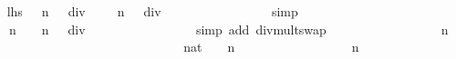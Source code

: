 \begin{isabellebody}
\ \isamarkupfalse%
\ {\isachardoublequoteopen}{\isacharquery}lhs\ {\isacharequal}\ \ {}{\isacharasterisk}{\isacharparenleft}{\isacharparenleft}{}{\isacharcircum}n\ {\isacharminus}\ {}{\isacharparenright}\ div\ {}{\isacharparenright}\ {\isacharplus}\ {\isacharparenleft}{}\ {\isacharcircum}\ n\ {\isacharplus}\ {}{\isacharparenright}\ div\ {}{\isachardoublequoteclose}\isanewline
\ \ \ \ \ \ \ \ \ \ \ \ \ \ \isamarkupfalse%
\ simp\isanewline
\ \ \ \ \ \ \ \ \ \ \ \ \isamarkupfalse%
\ \isamarkupfalse%
\ {\isachardoublequoteopen}{\isachardot}{\isachardot}{\isachardot}\ {\isacharequal}\ {\isacharparenleft}{\isacharparenleft}{}{\isacharasterisk}{}{\isacharcircum}n\ {\isacharminus}\ {}{\isacharparenright}\ {\isacharplus}\ {\isacharparenleft}{}{\isacharcircum}n\ {\isacharplus}\ {}{\isacharparenright}{\isacharparenright}\ div\ {}{\isachardoublequoteclose}\isanewline
\ \ \ \ \ \ \ \ \ \ \ \ \ \ \isamarkupfalse%
\ {\isacharparenleft}simp\ add{\isacharcolon}\ div{\isacharunderscore}mult{\isacharunderscore}swap{\isacharparenright}\isanewline
\ \ \ \ \ \ \ \ \ \ \ \ \isamarkupfalse%
\ \isamarkupfalse%
\ {\isachardoublequoteopen}{\isachardot}{\isachardot}{\isachardot}\ {\isacharequal}\ {}{\isacharasterisk}{}{\isacharcircum}n{\isachardoublequoteclose}\isanewline
\ \ \ \ \ \ \ \ \ \ \ \ \isamarkupfalse%
{\isacharminus}\isanewline
\ \ \ \ \ \ \ \ \ \ \ \ \ \ \isamarkupfalse%
\ {\isachardoublequoteopen}{}\ {\isasymle}\ {\isacharparenleft}{}{\isacharcolon}{\isacharcolon}nat{\isacharparenright}\ {\isacharasterisk}\ {}\ {\isacharcircum}\ n{\isachardoublequoteclose}\isanewline
\ \ \ \ \ \ \ \ \ \ \ \ \ \ \ \ \isamarkupfalse%
\ {\isacharbackquoteopen}n\ {\isasymge}\ {}{\isacharbackquoteclose}\isanewline
\ \ \ \ \ \ \ \ \ \ \ \ \ \ \ \ \isamarkupfalse%

\end{isabellebody}
